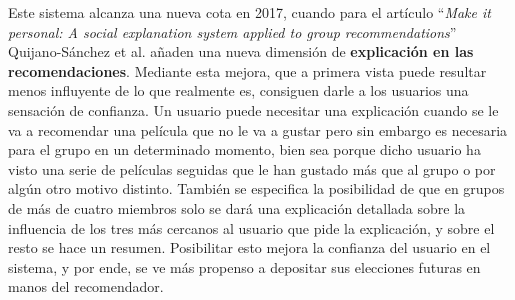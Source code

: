 Este sistema alcanza una nueva cota en 2017, cuando para el artículo ``\textit{Make it personal: A social explanation system applied to group recommendations}'' \cite{happymovie2017} Quijano-Sánchez et al. añaden una nueva dimensión de \textbf{explicación en las recomendaciones}. Mediante esta mejora, que a primera vista puede resultar menos influyente de lo que realmente es, consiguen darle a los usuarios una sensación de confianza. Un usuario puede necesitar una explicación cuando se le va a recomendar una película que no le va a gustar pero sin embargo es necesaria para el grupo en un determinado momento, bien sea porque dicho usuario ha visto una serie de películas seguidas que le han gustado más que al grupo o por algún otro motivo distinto. También se especifica la posibilidad de que en grupos de más de cuatro miembros solo se dará una explicación detallada sobre la influencia de los tres más cercanos al usuario que pide la explicación, y sobre el resto se hace un resumen. Posibilitar esto mejora la confianza del usuario en el sistema, y por ende, se ve más propenso a depositar sus elecciones futuras en manos del recomendador.